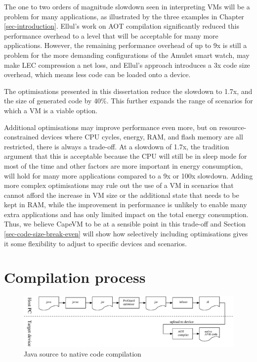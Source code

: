 The one to two orders of magnitude slowdown seen in interpreting VMs will be a problem for many applications, as illustrated by the three examples in Chapter \ref{sec-introduction}. Ellul's work \cite{Ellul:2012thesis} on AOT compilation significantly reduced this performance overhead to a level that will be acceptable for many more applications. However, the remaining performance overhead of up to 9x is still a problem for the more demanding configurations of the Amulet smart watch, may make LEC compression a net loss, and Ellul's approach introduces a 3x code size overhead, which means less code can be loaded onto a device.

The optimisations presented in this dissertation reduce the slowdown to 1.7x, and the size of generated code by 40\%. This further expands the range of scenarios for which a VM is a viable option.

Additional optimisations may improve performance even more, but on resource-constrained devices where CPU cycles, energy, RAM, and flash memory are all restricted, there is always a trade-off. At a slowdown of 1.7x, the tradition argument that this is acceptable because the CPU will still be in sleep mode for most of the time and other factors are more important in energy consumption, will hold for many more applications compared to a 9x or 100x slowdown. Adding more complex optimisations may rule out the use of a VM in scenarios that cannot afford the increase in VM size or the additional state that needs to be kept in RAM, while the improvement in performance is unlikely to enable many extra applications and has only limited impact on the total energy consumption. Thus, we believe CapeVM to be at a sensible point in this trade-off and Section \ref{sec-code-size-break-even} will show how selectively including optimisations gives it some flexibility to adjust to specific devices and scenarios.


\section{Compilation process}
\label{sec-compilation-process}

\begin{figure}
\includegraphics[width=\linewidth]{compilation-process.eps}
\caption{Java source to native code compilation}
\label{fig-translation-process}
\end{figure}


